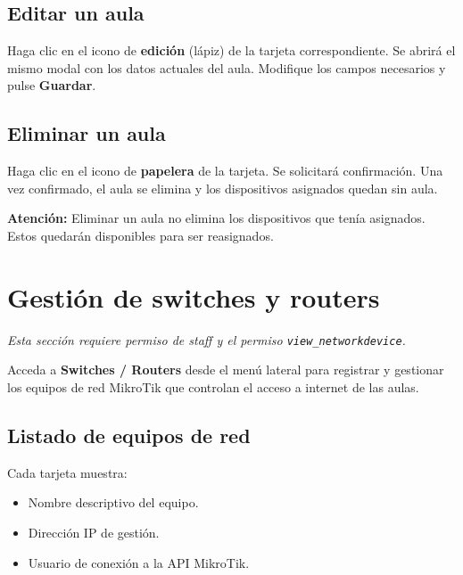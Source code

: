 \documentclass[12pt,a4paper]{article}
\begin{document}
\subsection{Editar un aula}

Haga clic en el icono de \textbf{edición} (lápiz) de la tarjeta correspondiente. Se abrirá el mismo modal con los datos actuales del aula. Modifique los campos necesarios y pulse \textbf{Guardar}.

\subsection{Eliminar un aula}

Haga clic en el icono de \textbf{papelera} de la tarjeta. Se solicitará confirmación. Una vez confirmado, el aula se elimina y los dispositivos asignados quedan sin aula.

\begin{warnnote}
\textbf{Atención:} Eliminar un aula no elimina los dispositivos que tenía asignados. Estos quedarán disponibles para ser reasignados.
\end{warnnote}

\section{Gestión de switches y routers}

\textit{Esta sección requiere permiso de staff y el permiso \texttt{view\_networkdevice}.}

Acceda a \textbf{Switches / Routers} desde el menú lateral para registrar y gestionar los equipos de red MikroTik que controlan el acceso a internet de las aulas.

\subsection{Listado de equipos de red}

Cada tarjeta muestra:

\begin{itemize}
    \item Nombre descriptivo del equipo.
    \item Dirección IP de gestión.
    \item Usuario de conexión a la API MikroTik.
\end{itemize}
\end{document}
